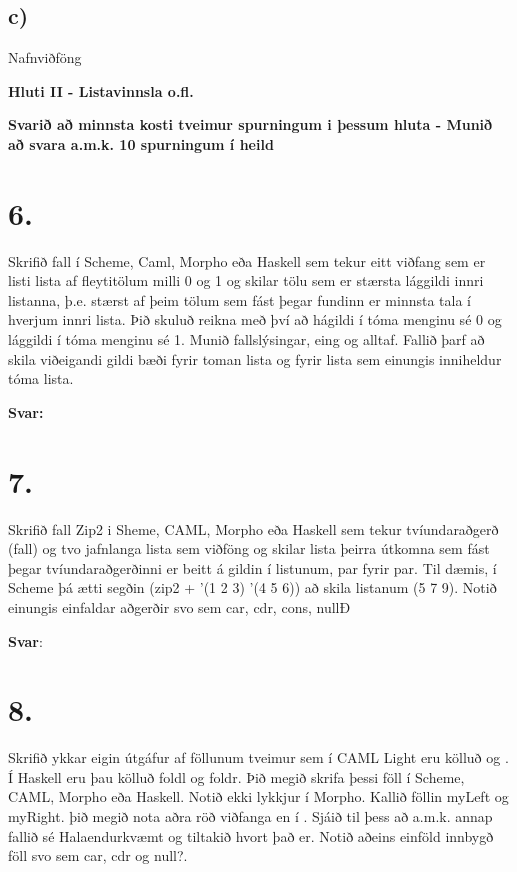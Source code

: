 \documentclass{article}
\begin{document}
     \subsection{c)} Nafnviðföng


     \newpage

     \begin{center}
        \textbf{Hluti II - Listavinnsla o.fl.}


        \textbf{Svarið að minnsta kosti tveimur spurningum i þessum hluta - Munið að svara a.m.k. 10 spurningum í heild}
     \end{center}

     \section{6.}
     Skrifið fall í Scheme, Caml, Morpho eða Haskell sem tekur eitt viðfang sem er listi lista af fleytitölum milli 0 og 1 og skilar tölu sem 
     er stærsta lággildi innri listanna, þ.e. stærst af þeim tölum sem fást 
     þegar fundinn er minnsta tala í hverjum innri lista. Þið skuluð reikna
     með því að hágildi í tóma menginu sé 0 og lággildi í tóma menginu sé 1.
     Munið fallslýsingar, eing og alltaf. Fallið þarf að skila viðeigandi 
     gildi bæði fyrir toman lista og fyrir lista sem einungis inniheldur tóma lista.

     \textbf{Svar:}



     \newpage 

     \section{7.}

     Skrifið fall Zip2 i Sheme, CAML, Morpho eða Haskell sem tekur 
     tvíundaraðgerð (fall) og tvo jafnlanga lista sem viðföng og skilar lista þeirra útkomna sem fást þegar tvíundaraðgerðinni er beitt á
     gildin í listunum, par fyrir par. Til dæmis, í Scheme þá ætti segðin
     (zip2 + '(1 2 3) '(4 5 6)) að skila listanum (5 7 9). Notið einungis
     einfaldar aðgerðir svo sem car, cdr, cons, nullÐ

     \textbf{Svar}:


     \newpage
     \section{8.}
     Skrifið ykkar eigin útgáfur af föllunum tveimur sem í CAML Light 
     eru kölluð  og . Í Haskell eru þau kölluð foldl og foldr. 
     Þið megið skrifa þessi föll í Scheme, CAML, Morpho eða Haskell. Notið
     ekki lykkjur í Morpho. Kallið föllin myLeft og myRight. þið megið nota aðra röð viðfanga en í . Sjáið til þess að a.m.k.
     annap fallið sé Halaendurkvæmt og tiltakið hvort það er. Notið 
     aðeins einföld innbygð föll svo sem car, cdr og null?.
\end{document}

